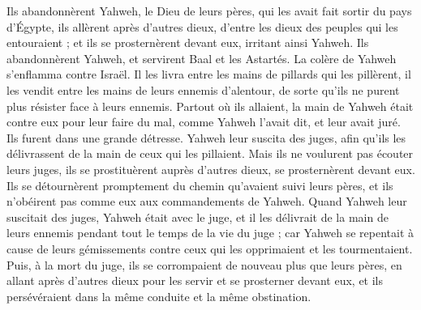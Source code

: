 \begin{multicols}{2}
Ils abandonnèrent Yahweh, le Dieu de leurs pères, qui les avait fait sortir du pays d’Égypte, ils allèrent après d'autres dieux, d'entre les dieux des peuples qui les entouraient ; et ils se prosternèrent devant eux, irritant ainsi Yahweh.
Ils abandonnèrent Yahweh, et servirent Baal et les Astartés.
La colère de Yahweh s'enflamma contre Israël.  Il les livra entre les mains de pillards qui les pillèrent, il les vendit entre les mains de leurs ennemis d'alentour, de sorte qu'ils ne purent plus résister face à leurs ennemis.
Partout où ils allaient, la main de Yahweh était contre eux pour leur faire du mal, comme Yahweh  l’avait dit, et leur avait juré. Ils furent dans une grande détresse.
Yahweh leur suscita des juges, afin qu’ils les délivrassent de la main de ceux qui les pillaient.
Mais ils ne voulurent pas écouter leurs juges, ils se prostituèrent auprès d'autres dieux, se prosternèrent devant eux.  Ils se détournèrent promptement du chemin qu’avaient suivi leurs pères, et ils n’obéirent pas comme eux aux commandements de Yahweh.
Quand Yahweh leur suscitait des juges, Yahweh était avec le juge, et il les délivrait de la main de leurs ennemis pendant tout le temps de la vie du juge ; car Yahweh se repentait à cause de leurs gémissements contre ceux qui les opprimaient et les tourmentaient.
Puis, à la mort du juge, ils se corrompaient de nouveau plus que leurs pères, en allant après d'autres dieux pour les servir et se prosterner devant eux, et ils persévéraient dans la même conduite et la même obstination.

\end{multicols}
